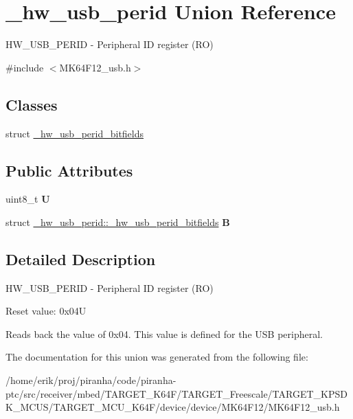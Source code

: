 \hypertarget{union__hw__usb__perid}{}\section{\+\_\+hw\+\_\+usb\+\_\+perid Union Reference}
\label{union__hw__usb__perid}


H\+W\+\_\+\+U\+S\+B\+\_\+\+P\+E\+R\+ID -\/ Peripheral ID register (RO)  




{\ttfamily \#include $<$M\+K64\+F12\+\_\+usb.\+h$>$}

\subsection*{Classes}
\begin{DoxyCompactItemize}
\item 
struct \hyperlink{struct__hw__usb__perid_1_1__hw__usb__perid__bitfields}{\+\_\+hw\+\_\+usb\+\_\+perid\+\_\+bitfields}
\end{DoxyCompactItemize}
\subsection*{Public Attributes}
\begin{DoxyCompactItemize}
\item 
uint8\+\_\+t {\bfseries U}\hypertarget{union__hw__usb__perid_a095fd17744f284bf564a5b238a0e954f}{}\label{union__hw__usb__perid_a095fd17744f284bf564a5b238a0e954f}

\item 
struct \hyperlink{struct__hw__usb__perid_1_1__hw__usb__perid__bitfields}{\+\_\+hw\+\_\+usb\+\_\+perid\+::\+\_\+hw\+\_\+usb\+\_\+perid\+\_\+bitfields} {\bfseries B}\hypertarget{union__hw__usb__perid_ae52ed7a3c479e15e4ab5286e94a50a0a}{}\label{union__hw__usb__perid_ae52ed7a3c479e15e4ab5286e94a50a0a}

\end{DoxyCompactItemize}


\subsection{Detailed Description}
H\+W\+\_\+\+U\+S\+B\+\_\+\+P\+E\+R\+ID -\/ Peripheral ID register (RO) 

Reset value\+: 0x04U

Reads back the value of 0x04. This value is defined for the U\+SB peripheral. 

The documentation for this union was generated from the following file\+:\begin{DoxyCompactItemize}
\item 
/home/erik/proj/piranha/code/piranha-\/ptc/src/receiver/mbed/\+T\+A\+R\+G\+E\+T\+\_\+\+K64\+F/\+T\+A\+R\+G\+E\+T\+\_\+\+Freescale/\+T\+A\+R\+G\+E\+T\+\_\+\+K\+P\+S\+D\+K\+\_\+\+M\+C\+U\+S/\+T\+A\+R\+G\+E\+T\+\_\+\+M\+C\+U\+\_\+\+K64\+F/device/device/\+M\+K64\+F12/M\+K64\+F12\+\_\+usb.\+h\end{DoxyCompactItemize}
